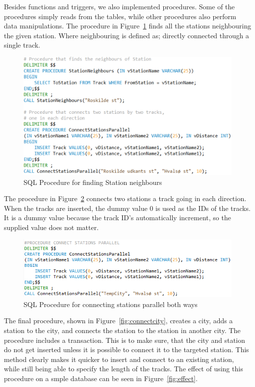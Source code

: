 Besides functions and triggers, we also implemented procedures. Some of the 
procedures simply reads from the tables, while other procedures also perform 
data manipulations. The procedure in Figure~\ref{fig:neighbors} finds all the 
stations neighbouring the given station. Where neighbouring is defined as; 
directly connected through a single track.

\begin{figure}[h]
    \centering
    \includegraphics[scale=.75]{img/SQL_PROCEDURE_Neighbours}
    \caption{SQL Procedure for finding Station neighbours}
    \label{fig:neighbors}
\end{figure}

The procedure in Figure~\ref{fig:connectstation} connects two stations a track 
going in each direction. When the tracks are inserted, the dummy value 0 is 
used as the IDs of the tracks. It is a dummy value because the track ID's 
automatically increment, so the supplied value does not matter. 

\begin{figure}[h]
    \centering
    \includegraphics[scale=.75]{img/SQL_PROCEDURE_ConnectParallel}
    \caption{SQL Procedure for connecting stations parallel both ways}
    \label{fig:connectstation}
\end{figure}

The final procedure, shown in Figure~\ref{fig:connectcity}, creates a city, 
adds a station to the city, and connects the station to the station in another 
city. The procedure includes a transaction. This is to make sure, that the city 
and station do not get inserted unless it is possible to connect 
it to the targeted station. This method clearly makes it quicker to insert and 
connect to an existing station, while still being able to specify the length of 
the tracks. The effect of using this procedure on a smple database can be seen 
in Figure~\ref{fig:effect}.

